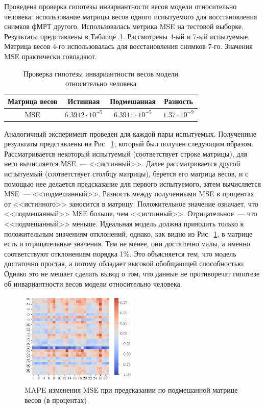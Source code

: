 Проведена проверка гипотезы инвариантности весов модели относительно человека:
использование матрицы весов одного испытуемого для восстановления снимков фМРТ другого.
Использовалась метрика MSE на тестовой выборке.
Результаты представлены в Таблице~\ref{table:inv}.
Рассмотрены 4-ый и 7-ый испытуемые. Матрица весов 4-го использовалась для восстановления
снимков 7-го.
Значения MSE практически совпадают. 

\begin{table}[h!]
	\centering
	\caption{Проверка гипотезы инвариантности весов модели относительно человека}
	\begin{tabular}{|c|c|c|c|}
		\hline
		Матрица весов & Истинная             & Подмешанная  & Разность        \\ \hline \hline
		MSE           & $6.3912 \cdot 10^{-5}$ & $6.3911 \cdot 10^{-5}$ & $1.37 \cdot 10^{-9}$ \\ \hline
	\end{tabular}
	\label{table:inv}
\end{table}

Аналогичный эксперимент проведен для каждой пары испытуемых.
Полученные результаты представлены на Рис.~\ref{fig:heatmap},
который был получен следующим образом.
Рассматривается некоторый испытуемый (соответствует строке матрицы), 
для него вычисляется MSE~--- <<истинный>>.
Далее рассматривается другой испытуемый (соответствует столбцу матрицы),
берется его матрица весов, и с помощью нее делается предсказание для первого 
испытуемого, затем вычисляется MSE~--- <<подмешанный>>. 
Разность между полученными MSE в процентах от <<истинного>> заносится в матрицу.
Положительное значение означает, что <<подмешанный>> MSE больше, чем <<истинный>>.
Отрицательное~--- что <<подмешанный>> меньше.
Идеальная модель должна приводить только к положительным значениям отклонений, однако,
как видно из Рис.~\ref{fig:heatmap}, в матрице есть и отрицательные значения.
Тем не менее, они достаточно малы, а именно соответствуют отклонениям порядка 1\%.
Это объясняется тем, что модель достаточно простая, а потому обладает
высокой обобщающей способностью.
Однако это не мешает сделать вывод о том, что данные не противоречат гипотезе 
об инвариантности весов модели относительно человека.

\begin{figure}[h!]
	\centering
	\includegraphics[width=0.5\textwidth]{images/fmri_forecasting/heatmap.pdf}
	\caption{MAPE изменения MSE при предсказании по подмешанной матрице весов (в процентах)}
	\label{fig:heatmap}
\end{figure}

